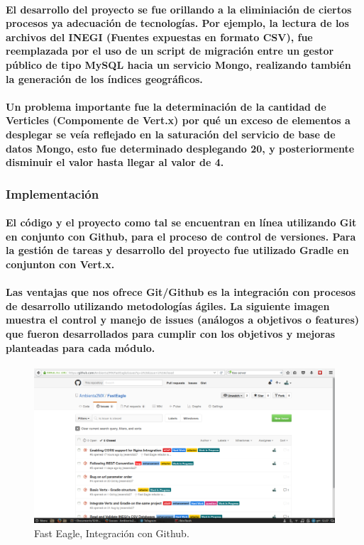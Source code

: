     \paragraph{El desarrollo del proyecto se fue orillando a la eliminiación de ciertos procesos ya adecuación de tecnologías. Por ejemplo, la lectura de los archivos del INEGI (Fuentes expuestas en formato CSV), fue reemplazada por el uso de un script de migración entre un gestor público de tipo MySQL hacia un servicio Mongo, realizando también la generación de los índices geográficos.}
    \paragraph{Un problema importante fue la determinación de la cantidad de Verticles (Compomente de Vert.x) por qué un exceso de elementos a desplegar se veía reflejado en la saturación del servicio de base de datos Mongo, esto fue determinado desplegando 20, y posteriormente disminuir el valor hasta llegar al valor de 4.}
  \subsubsection{Implementación}
    \paragraph{El código y el proyecto como tal se encuentran en línea utilizando Git\cite{38} en conjunto con Github\cite{39}, para el proceso de control de versiones. Para la gestión de tareas y desarrollo del proyecto fue utilizado Gradle en conjunton con Vert.x.}
    \paragraph{Las ventajas que nos ofrece Git/Github es la integración con procesos de desarrollo utilizando metodologías ágiles. La siguiente imagen muestra el control y manejo de issues (análogos a objetivos o features) que fueron desarrollados para cumplir con los objetivos y mejoras planteadas para cada módulo.}
    \begin{figure}[h!]
        \centering
          \includegraphics[width=\textwidth]{./images/FastEagleIssues.png}
          \caption{Fast Eagle, Integración con Github.}
    \end{figure}
